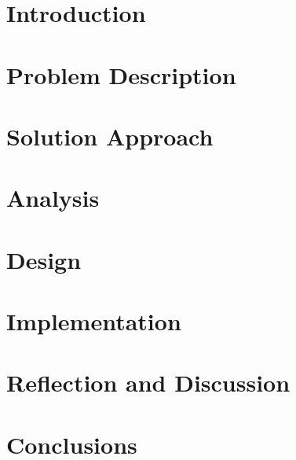 
\section{Introduction} \label{sec:intro}


\section{Problem Description} \label{sec:probdesc}


\section{Solution Approach} \label{sec:solapp}


%

\section{Analysis} \label{sec:analysis}


\section{Design} \label{sec:design}


\section{Implementation} \label{sec:impl}


%

\section{Reflection and Discussion} \label{sec:reflect}


\section{Conclusions} \label{sec:conclusion}




\label{sec:ref}
\label{EndOfMainMatter}
\newpage

